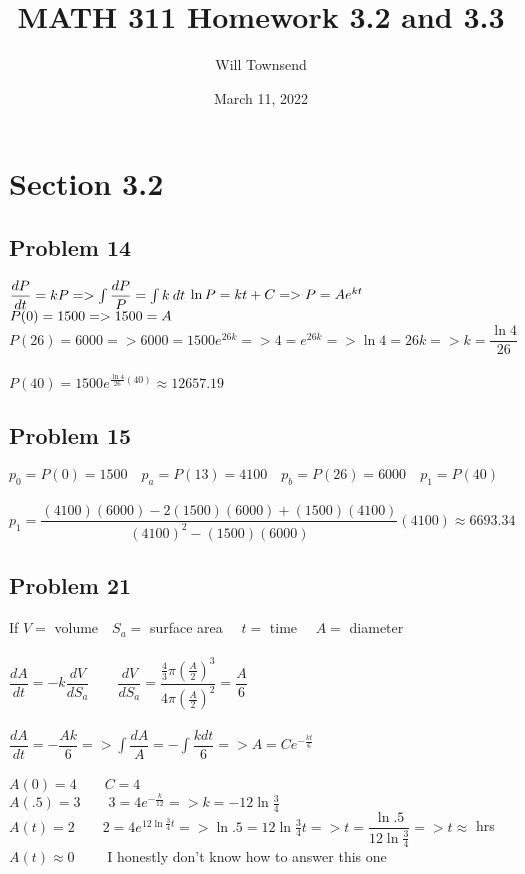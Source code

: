 \documentclass[12pt]{exam}
\title{\textbf{MATH 311 Homework 3.2 and 3.3}}
\author{Will Townsend}
\date{March 11, 2022}
\begin{document}
\maketitle

\section*{Section 3.2}
\subsection*{Problem 14}
$\dfrac{dP}{dt}=kP=>\int\dfrac{dP}{P}=\int k\:dt\\\\$
$\ln{P}=kt+C => P=Ae^{kt}\\\\$
$P(0)=1500=>1500=A\\\\$
$P(26)=6000=>6000=1500e^{26k}=>4=e^{26k}=>\ln{4}=26k=>k=\dfrac{\ln{4}}{26}$\\\\
$P(40)=1500e^{\frac{\ln{4}}{26}(40)}\approx12657.19$
\subsection*{Problem 15}
$p_0=P(0)=1500\quad p_a=P(13)=4100\quad p_b=P(26)=6000\quad p_1=P(40)$\\\\
$p_1=\dfrac{(4100)(6000)-2(1500)(6000)+(1500)(4100)}{(4100)^2-(1500)(6000)}(4100)\approx6693.34$
\subsection*{Problem 21}
If $V=$ volume$\quad S_a=$ surface area $\quad t=$ time $\quad A=$ diameter\\\\
$\dfrac{dA}{dt}=-k\dfrac{dV}{dS_a}\qquad\dfrac{dV}{dS_a}=\dfrac{\frac{4}{3}\pi\left(\frac{A}{2}\right)^3}{4\pi\left(\frac{A}{2}\right)^2}=\dfrac{A}{6}$\\\\
$\dfrac{dA}{dt}=-\dfrac{Ak}{6}=>\int\dfrac{dA}{A}=-\int\dfrac{kdt}{6}=>A=Ce^{-\frac{kt}{6}}$\\\\
$A(0)=4\qquad C=4$\\
$A(.5)=3\qquad 3=4e^{-\frac{k}{12}}=>k=-12\ln{\frac{3}{4}}$\\
$A(t)=2\qquad 2=4e^{12\ln{\frac{3}{4}}t}=>\ln{.5}=12\ln{\frac{3}{4}}t=>t=\dfrac{\ln{.5}}{12\ln{\frac{3}{4}}}=>t\approx$ hrs\\
$A(t)\approx0\qquad$ I honestly don't know how to answer this one
\end{document}
